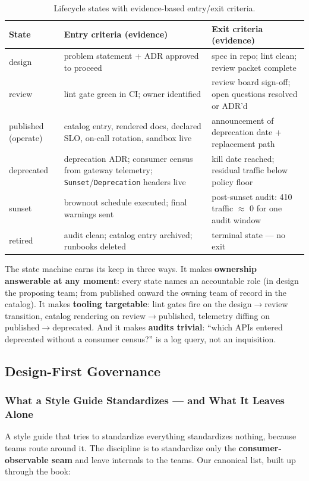 \begin{table}[htbp]
\centering\small
\begin{tabularx}{\textwidth}{l X X}
\toprule
\textbf{State} & \textbf{Entry criteria (evidence)} & \textbf{Exit criteria (evidence)} \\
\midrule
design & problem statement + ADR approved to proceed & spec in repo; lint clean; review packet complete \\
review & lint gate green in CI; owner identified & review board sign-off; open questions resolved or ADR'd \\
published (operate) & catalog entry, rendered docs, declared SLO, on-call rotation, sandbox live & announcement of deprecation date + replacement path \\
deprecated & deprecation ADR; consumer census from gateway telemetry; \texttt{Sunset}/\texttt{Deprecation} headers live & kill date reached; residual traffic below policy floor \\
sunset & brownout schedule executed; final warnings sent & post-sunset audit: 410 traffic $\approx$ 0 for one audit window \\
retired & audit clean; catalog entry archived; runbooks deleted & terminal state --- no exit \\
\bottomrule
\end{tabularx}
\caption{Lifecycle states with evidence-based entry/exit criteria.}
\label{tab:ch20-states}
\end{table}

The state machine earns its keep in three ways. It makes
\textbf{ownership answerable at any moment}: every state names an
accountable role (in \textsf{design} the proposing team; from
\textsf{published} onward the owning team of record in the catalog). It
makes \textbf{tooling targetable}: lint gates fire on the
\textsf{design}$\rightarrow$\textsf{review} transition, catalog rendering
on \textsf{review}$\rightarrow$\textsf{published}, telemetry diffing on
\textsf{published}$\rightarrow$\textsf{deprecated}. And it makes
\textbf{audits trivial}: ``which APIs entered \textsf{deprecated} without
a consumer census?'' is a log query, not an inquisition.

\subsection{Design-First Governance}
\label{sec:ch20-governance}

\subsubsection{What a Style Guide Standardizes --- and What It Leaves Alone}
A style guide that tries to standardize everything standardizes nothing,
because teams route around it. The discipline is to standardize only the
\textbf{consumer-observable seam} and leave internals to the teams. Our
canonical list, built up through the book:

